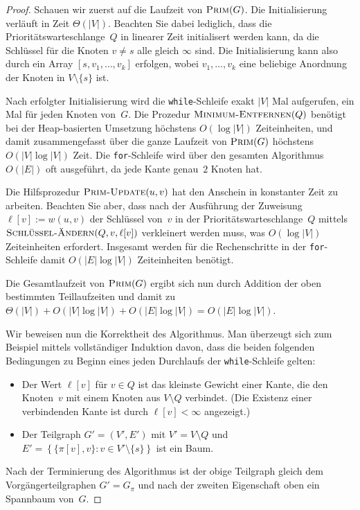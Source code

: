 \begin{proof}
Schauen wir zuerst auf die Laufzeit von $\mathop{\text{\textsc{Prim}}}(G)$.
Die Initialisierung verläuft in Zeit $\Theta(|V|)$.
Beachten Sie dabei lediglich, dass die Prioritätswarteschlange~$Q$ in linearer Zeit initialisert werden kann, da die Schlüssel für die Knoten $v \neq s$ alle gleich $\infty$ sind.
Die Initialisierung kann also durch ein Array $[s,v_1,\ldots,v_k]$ erfolgen, wobei $v_1,\ldots,v_k$ eine beliebige Anordnung der Knoten in $V \setminus \{s\}$ ist.

Nach erfolgter Initialisierung wird die \texttt{while}-Schleife exakt $|V|$ Mal aufgerufen, ein Mal für jeden Knoten von~$G$.
Die Prozedur $\mathop{\text{\textsc{Minimum-Entfernen}}}(Q)$ benötigt bei der Heap-basierten Umsetzung höchstens $O(\log |V|)$ Zeiteinheiten, und damit zusammengefasst über die ganze Laufzeit von $\mathop{\text{\textsc{Prim}}}(G)$ höchstens $O(|V|\log|V|)$ Zeit.
Die \texttt{for}-Schleife wird über den gesamten Algorithmus $O(|E|)$ oft ausgeführt, da jede Kante genau~$2$ Knoten hat.

Die Hilfsprozedur $\mathop{\text{\textsc{Prim-Update}}}(u,v)$ hat den Anschein in konstanter Zeit zu arbeiten.
Beachten Sie aber, dass nach der Ausführung der Zuweisung $\ell[v]:=w(u,v)$ der Schlüssel von~$v$ in der Prioritätswarteschlange~$Q$ mittels $\mathop{\text{\textsc{Schlüssel-Ändern}}}(Q,v,\ell[v])$ verkleinert werden muss, was $O(\log|V|)$ Zeiteinheiten erfordert.
Insgesamt werden für die Rechenschritte in der \texttt{for}-Schleife damit $O(|E|\log|V|)$ Zeiteinheiten benötigt.

Die Gesamtlaufzeit von $\mathop{\text{\textsc{Prim}}}(G)$ ergibt sich nun durch Addition der oben bestimmten Teillaufzeiten und damit zu $\Theta(|V|)+O(|V|\log|V|)+O(|E|\log|V|) = O(|E|\log|V|)$.

\condclearpage

Wir beweisen nun die Korrektheit des Algorithmus.
Man überzeugt sich zum Beispiel mittels vollständiger Induktion davon, dass die beiden folgenden Bedingungen zu Beginn eines jeden Durchlaufs der \texttt{while}-Schleife gelten: 
%
\begin{itemize}
 \item Der Wert $\ell[v]$ für $v \in Q$ ist das kleinste Gewicht einer Kante, die den Knoten~$v$ mit einem Knoten aus $V \setminus Q$ verbindet.
 (Die Existenz einer verbindenden Kante ist durch $\ell[v] < \infty$ angezeigt.) 
 \item Der Teilgraph $G'=(V',E')$ mit $V' = V \setminus Q$ und $E' = \left\{\{\pi[v],v\} : v \in V' \setminus \{s\}\right\}$ ist ein Baum. 
\end{itemize}
%
Nach der Terminierung des Algorithmus ist der obige Teilgraph gleich dem Vorgängerteilgraphen $G' = G_\pi$ und nach der zweiten Eigenschaft oben ein Spannbaum von~$G$.


\end{proof}

